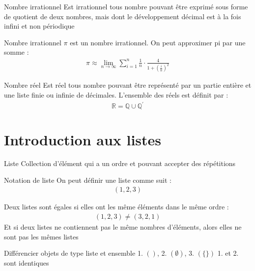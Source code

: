 \documentclass[8pt]{report}
\begin{document}
\begin{multicols*}{2}
\begin{Definition}{Nombre irrationnel}{}
    Est irrationnel tous nombre pouvant être exprimé sous forme de quotient de deux 
    nombres, mais dont le développement décimal est à la fois 
    infini et non périodique 
\end{Definition}

\begin{EExample}{Nombre irrationnel}{}
  $\pi$ est un nombre irrationnel. On peut approximer pi par une somme :
  \begin{align*}
  \pi \approx \lim_{{n \to \infty}} \sum_{{i=1}}^{n} \frac{1}{n} \cdot \frac{4}{1 + \left(\frac{i}{n}\right)^2}
  \end{align*}
\end{EExample}
\begin{Definition}{Nombre réel}{}
    Est réel tous nombre pouvant être représenté par un partie entière et une liste 
    finie ou infinie de décimales. L'ensemble des réels est définit par :
    \begin{align}
      \mathbb{R} = \mathbb{Q} \cup \mathbb{Q}^{'}
    \end{align}
\end{Definition}
\section{Introduction aux listes}

\begin{Definition}{Liste}{}
   Collection d'élément qui a un ordre et pouvant accepter des répétitions
\end{Definition}

\begin{Syntaxe}{Notation de liste}{}
  On peut définir une liste comme suit :
  \begin{align*}
      \left(1,2,3 \right)
  \end{align*}
\end{Syntaxe}
\begin{Remarque}{}{}
    Deux listes sont égales si elles ont les même éléments dans le même ordre :
    \begin{align*}
    \left( 1, 2, 3\right) \neq \left( 3, 2, 1\right)
    \end{align*}
    Et si deux listes ne contiennent pas le même nombres d'éléments, alors elles ne sont pas 
    les mêmes listes 
\end{Remarque}
\begin{EExample}{Différencier objets de type liste et ensemble}{}
  1. $\left( \right)$, 2. $\left(\emptyset \right)$, 3. $\left( \{ \}\right)$
  1. et 2. sont identiques 
\end{EExample}


\end{multicols*}
\end{document}
